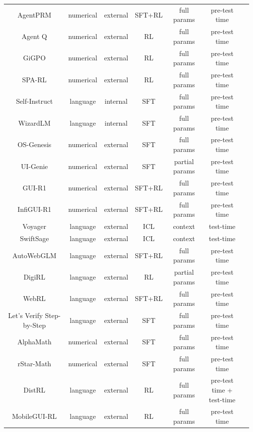 \documentclass[10pt]{article} %
\begin{document}
\begin{table}[!t]
{\begin{tabular}{ccccccc}
AgentPRM\citep{choudhury2025process} & numerical & external & SFT+RL & full params & pre-test time \\
Agent Q\citep{putta2024agentq} & numerical & external & RL & full params & pre-test time \\
GiGPO\citep{feng2025group} & numerical & external & RL & full params & pre-test time \\
SPA-RL\citep{wang2025spa} & numerical & external & RL & full params & pre-test time \\
Self-Instruct\citep{wang2022self} & language & internal & SFT & full params & pre-test time \\
WizardLM\citep{xu2024wizardlm} & language & internal & SFT & full params & pre-test time \\
OS-Genesis\citep{sun2024genesis} & numerical & external & SFT & full params & pre-test time \\
UI-Genie\citep{xiao2025ui} & numerical & external & SFT & partial params & pre-test time \\
GUI-R1\citep{luo2025gui} & numerical & external & SFT+RL & full params & pre-test time \\
InfiGUI-R1\citep{liu2025infigui} & numerical & external & SFT+RL & full params & pre-test time \\
Voyager\citep{wang2023voyager} & language & external & ICL & context & test-time \\
SwiftSage\citep{lin2023swiftsage} & language & external & ICL & context & test-time \\
AutoWebGLM\citep{lai2024autowebglm} & language & external & SFT+RL & full params & pre-test time \\
DigiRL\citep{bai2024digirl} & language & external & RL & partial params & pre-test time \\
WebRL\citep{qi2024webrl} & language & external & SFT+RL & full params & pre-test time \\
Let's Verify Step-by-Step\citep{lightman2023let} & language & external & SFT & full params & pre-test time \\
AlphaMath\citep{chen2024alphamath} & numerical & external & SFT & full params & pre-test time \\
rStar-Math\citep{guan2025rstar} & numerical & external & SFT & full params & pre-test time \\
DistRL\citep{wang2024distrl} & language & external & RL & full params & pre-test time + test-time \\
MobileGUI-RL\citep{shi2025mobileguirladvancingmobilegui} & language & external & RL & full params & pre-test time \\ \midrule

\end{tabular}}
\end{table}
\end{document}

